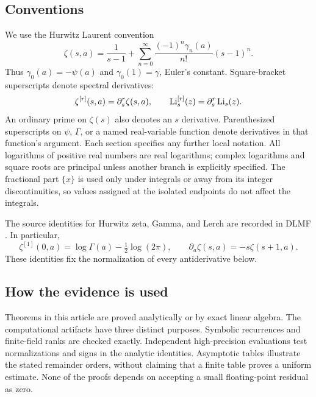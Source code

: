 \subsection{Conventions}
We use the Hurwitz Laurent convention
\begin{equation}\label{scope:laurent}
 \zeta(s,a)=\frac1{s-1}
       +\sum_{n=0}^{\infty}\frac{(-1)^n\gamma_n(a)}{n!}(s-1)^n.
\end{equation}
Thus $\gamma_0(a)=-\psi(a)$ and $\gamma_0(1)=\gamma$, Euler's constant.
Square-bracket superscripts denote spectral derivatives:
\[
 \zeta^{[r]}(s,a)=\partial_s^r\zeta(s,a),\qquad
 \operatorname{Li}_s^{[r]}(z)=\partial_s^r\operatorname{Li}_s(z).
\]
An ordinary prime on $\zeta(s)$ also denotes an $s$ derivative. Parenthesized
superscripts on $\psi$, $\Gamma$, or a named real-variable function denote
derivatives in that function's argument. Each section specifies any further
local notation. All logarithms of positive real numbers are real logarithms;
complex logarithms and square roots are principal unless another branch is
explicitly specified. The fractional part $\{x\}$ is used only under
integrals or away from its integer discontinuities, so values assigned at
the isolated endpoints do not affect the integrals.

The source identities for Hurwitz zeta, Gamma, and Lerch are recorded in
DLMF \cite{dlmfhurwitz,dlmflerch}. In particular,
\begin{equation}\label{scope:lerchidentity}
 \zeta^{[1]}(0,a)=\log\Gamma(a)-\tfrac12\log(2\pi),
 \qquad \partial_a\zeta(s,a)=-s\zeta(s+1,a).
\end{equation}
These identities fix the normalization of every antiderivative below.

\subsection{How the evidence is used}
Theorems in this article are proved analytically or by exact linear algebra.
The computational artifacts have three distinct purposes. Symbolic
recurrences and finite-field ranks are checked exactly. Independent
high-precision evaluations test normalizations and signs in the analytic
identities. Asymptotic tables illustrate the stated remainder orders, without
claiming that a finite table proves a uniform estimate. None of the proofs
depends on accepting a small floating-point residual as zero.
